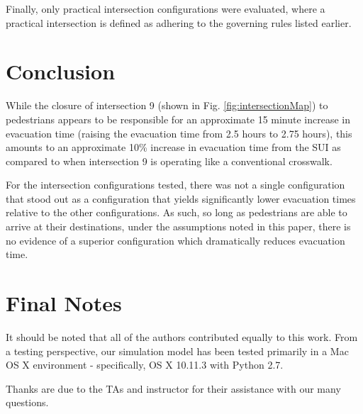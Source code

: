 \documentclass[12pt]{article}
\begin{document}
Finally, only practical intersection configurations were evaluated, where a practical
intersection is defined as adhering to the governing rules listed earlier.

\section{Conclusion}
While the closure of intersection 9 (shown in Fig. \ref{fig:intersectionMap})
to pedestrians appears to be responsible for an approximate 15 minute increase
in evacuation time (raising the evacuation time from 2.5 hours to 2.75 hours),
this amounts to an approximate 10\% increase in evacuation time from the SUI
as compared to when intersection 9 is operating like a conventional crosswalk.

For the intersection configurations tested, there was not a single configuration
that stood out as a configuration that yields significantly lower evacuation
times relative to the other configurations.  As such, so long as pedestrians are able
to arrive at their destinations, under the assumptions noted in this paper,
there is no evidence of a superior configuration which dramatically reduces
evacuation time.

\section{Final Notes}
It should be noted that all of the authors contributed equally to this work.
From a testing perspective, our simulation model has been tested primarily in
a Mac OS X environment - specifically, OS X 10.11.3 with Python 2.7.

Thanks are due to the TAs and instructor for their assistance with our many
questions.

\clearpage
{}

\end{document}
